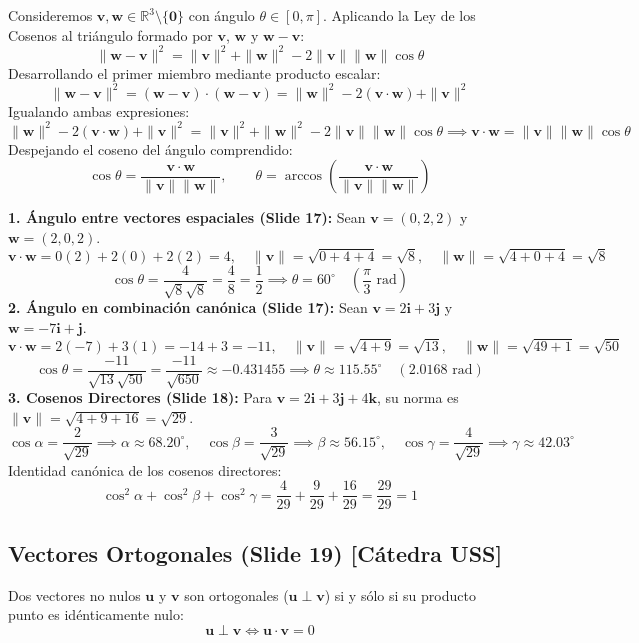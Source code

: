 \documentclass[10pt,letterpaper]{article}
\newcommand{\iu}{\mathbf{i}}
\newcommand{\ju}{\mathbf{j}}
\newcommand{\ku}{\mathbf{k}}
\newcommand{\vu}{\mathbf{u}}
\newcommand{\vv}{\mathbf{v}}
\newcommand{\vw}{\mathbf{w}}
\begin{document}
\begin{cajaTeorema}
Consideremos $\vv, \vw \in \mathbb{R}^3 \setminus \{\mathbf{0}\}$ con ángulo $\theta \in [0, \pi]$. Aplicando la Ley de los Cosenos al triángulo formado por $\vv$, $\vw$ y $\vw - \vv$:
\[
\|\vw - \vv\|^2 = \|\vv\|^2 + \|\vw\|^2 - 2\|\vv\|\|\vw\|\cos\theta
\]
Desarrollando el primer miembro mediante producto escalar:
\[
\|\vw - \vv\|^2 = (\vw - \vv) \cdot (\vw - \vv) = \|\vw\|^2 - 2(\vv \cdot \vw) + \|\vv\|^2
\]
Igualando ambas expresiones:
\[
\|\vw\|^2 - 2(\vv \cdot \vw) + \|\vv\|^2 = \|\vv\|^2 + \|\vw\|^2 - 2\|\vv\|\|\vw\|\cos\theta \implies \vv \cdot \vw = \|\vv\|\|\vw\|\cos\theta
\]
Despejando el coseno del ángulo comprendido:
\[
\cos\theta = \frac{\vv \cdot \vw}{\|\vv\|\|\vw\|}, \qquad \theta = \arccos\left(\frac{\vv \cdot \vw}{\|\vv\|\|\vw\|}\right)
\]
\end{cajaTeorema}

\begin{cajaEjemplo}
\textbf{1. Ángulo entre vectores espaciales (Slide 17):} Sean $\vv = (0, 2, 2)$ y $\vw = (2, 0, 2)$.
\[
\vv \cdot \vw = 0(2) + 2(0) + 2(2) = 4, \quad \|\vv\| = \sqrt{0+4+4} = \sqrt{8}, \quad \|\vw\| = \sqrt{4+0+4} = \sqrt{8}
\]
\[
\cos\theta = \frac{4}{\sqrt{8}\sqrt{8}} = \frac{4}{8} = \frac{1}{2} \implies \theta = 60^\circ \quad \left(\frac{\pi}{3}\text{ rad}\right)
\]
\textbf{2. Ángulo en combinación canónica (Slide 17):} Sean $\vv = 2\iu + 3\ju$ y $\vw = -7\iu + \ju$.
\[
\vv \cdot \vw = 2(-7) + 3(1) = -14 + 3 = -11, \quad \|\vv\| = \sqrt{4+9} = \sqrt{13}, \quad \|\vw\| = \sqrt{49+1} = \sqrt{50}
\]
\[
\cos\theta = \frac{-11}{\sqrt{13}\sqrt{50}} = \frac{-11}{\sqrt{650}} \approx -0.431455 \implies \theta \approx 115.55^\circ \quad (2.0168\text{ rad})
\]
\textbf{3. Cosenos Directores (Slide 18):} Para $\vv = 2\iu + 3\ju + 4\ku$, su norma es $\|\vv\| = \sqrt{4+9+16} = \sqrt{29}$.
\[
\cos\alpha = \frac{2}{\sqrt{29}} \implies \alpha \approx 68.20^\circ, \quad \cos\beta = \frac{3}{\sqrt{29}} \implies \beta \approx 56.15^\circ, \quad \cos\gamma = \frac{4}{\sqrt{29}} \implies \gamma \approx 42.03^\circ
\]
Identidad canónica de los cosenos directores:
\[
\cos^2\alpha + \cos^2\beta + \cos^2\gamma = \frac{4}{29} + \frac{9}{29} + \frac{16}{29} = \frac{29}{29} = 1
\]
\end{cajaEjemplo}

\subsection{Vectores Ortogonales (Slide 19) [Cátedra USS]}
Dos vectores no nulos $\vu$ y $\vv$ son ortogonales ($\vu \perp \vv$) si y sólo si su producto punto es idénticamente nulo:
\[
\vu \perp \vv \iff \vu \cdot \vv = 0
\]
\end{document}

